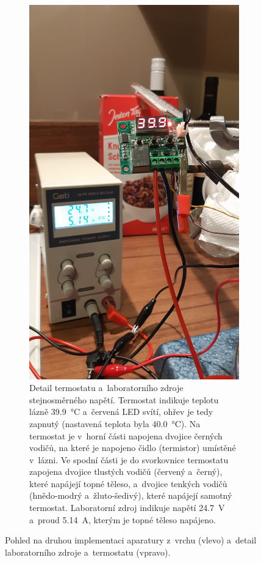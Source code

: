 \documentclass[12pt]{article}
\begin{document}
\begin{figure}[h!]
\begin{subfigure}[t]{.45\textwidth}
    \end{subfigure}
    \hfill
    \begin{subfigure}[t]{.45\textwidth}
        \includegraphics[angle = 270, width = \textwidth]{prilohy/elektro.jpg}
        \caption{Detail termostatu a~laboratorního zdroje stejnosměrného napětí. Termostat indikuje teplotu lázně \SI{39,9}{\degreeCelsius} a~červená LED svítí, ohřev je tedy zapnutý (nastavená teplota byla \SI{40,0}{\degreeCelsius}). Na termostat je v~horní části napojena dvojice černých vodičů, na které je napojeno čidlo (termistor) umístěné v~lázni. Ve spodní části je do svorkovnice termostatu zapojena dvojice tlustých vodičů (červený a~černý), které napájejí topné těleso, a~dvojice tenkých vodičů (hnědo-modrý a~žluto-šedivý), které napájejí samotný termostat. Laboratorní zdroj indikuje napětí \SI{24,7}{\volt} a~proud \SI{5,14}{\ampere}, kterým je topné těleso napájeno.}
    \end{subfigure}
    \caption{Pohled na druhou implementaci aparatury z~vrchu (vlevo) a~detail laboratorního zdroje a~termostatu (vpravo).}
    \label{fig:elektro}
\end{figure}
\end{document}
